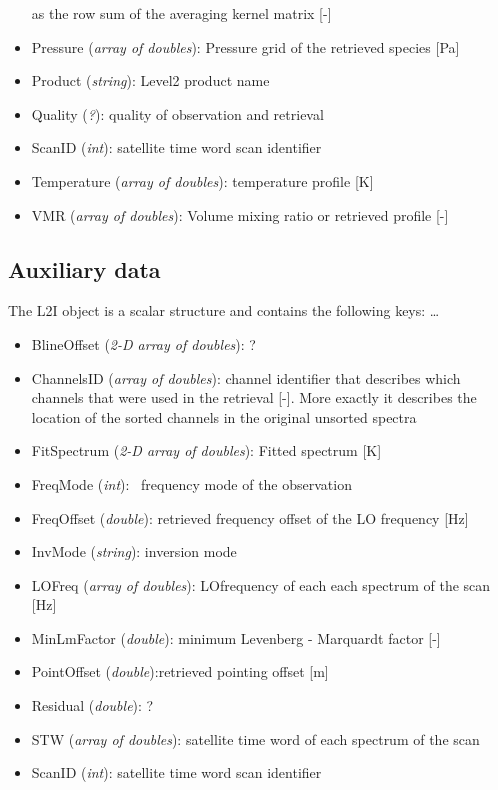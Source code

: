 \begin{itemize}
    as the row sum of the averaging kernel matrix [-]
    \item Pressure (\emph{array of doubles}): Pressure grid of the retrieved species [Pa] 
    \item Product (\emph{string}): Level2 product name
    \item Quality (\emph{?}): quality of observation and retrieval
    \item ScanID (\emph{int}): satellite time word scan identifier
    \item Temperature (\emph{array of doubles}): temperature profile [K]
    \item VMR (\emph{array of doubles}): Volume mixing ratio or retrieved profile [-] 

\end{itemize}

\subsection{Auxiliary data}

The L2I object is a scalar structure and contains the following keys:
\dots{}\

\begin{itemize}
  \item BlineOffset (\emph{2-D array of doubles}): ?
  \item ChannelsID (\emph{array of doubles}): channel identifier that describes
  which channels that were used in the retrieval [-]. More exactly it
  describes the location of the sorted channels in the original unsorted spectra
  \item FitSpectrum (\emph{2-D array of doubles}): Fitted spectrum [K]
  \item FreqMode (\emph{int}): \smr\ frequency mode of the observation
  \item FreqOffset (\emph{double}): retrieved frequency offset of the LO frequency [Hz]
  \item InvMode (\emph{string}): inversion mode
  \item LOFreq (\emph{array of doubles}): LOfrequency of each each spectrum of the scan [Hz]
  \item MinLmFactor (\emph{double}): minimum Levenberg - Marquardt factor [-]
  \item PointOffset (\emph{double}):retrieved pointing offset [m]
  \item Residual (\emph{double}): ? 
  \item STW (\emph{array of doubles}): satellite time word of each spectrum of the scan
  \item ScanID (\emph{int}): satellite time word scan identifier
\end{itemize}



